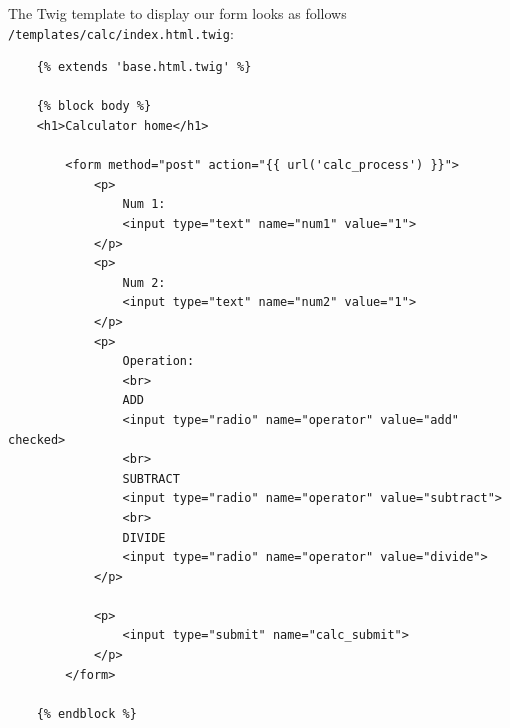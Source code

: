 \documentclass[a4paperpaper,openright]{book}
\newenvironment{Shaded}{}{}
\newcommand{\AnnotationTok}[1]{\textcolor[rgb]{0.38,0.63,0.69}{\textbf{\textit{#1}}}}
\newcommand{\CommentTok}[1]{\textcolor[rgb]{0.38,0.63,0.69}{\textit{#1}}}
\newcommand{\KeywordTok}[1]{\textcolor[rgb]{0.00,0.44,0.13}{\textbf{#1}}}
\newcommand{\NormalTok}[1]{#1}
\newcommand{\OtherTok}[1]{\textcolor[rgb]{0.00,0.44,0.13}{#1}}
\newcommand{\StringTok}[1]{\textcolor[rgb]{0.25,0.44,0.63}{#1}}
\begin{document}
\begin{Shaded}
\end{Shaded}

The Twig template to display our form looks as follows
\texttt{/templates/calc/index.html.twig}:

\begin{verbatim}
    {% extends 'base.html.twig' %}

    {% block body %}
    <h1>Calculator home</h1>

        <form method="post" action="{{ url('calc_process') }}">
            <p>
                Num 1:
                <input type="text" name="num1" value="1">
            </p>
            <p>
                Num 2:
                <input type="text" name="num2" value="1">
            </p>
            <p>
                Operation:
                <br>
                ADD
                <input type="radio" name="operator" value="add" checked>
                <br>
                SUBTRACT
                <input type="radio" name="operator" value="subtract">
                <br>
                DIVIDE
                <input type="radio" name="operator" value="divide">
            </p>

            <p>
                <input type="submit" name="calc_submit">
            </p>
        </form>

    {% endblock %}
\end{verbatim}
\end{document}
